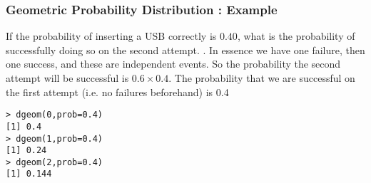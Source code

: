 
\begin{frame}[fragile]
\frametitle{Geometric Probability Distribution : Example}

If the probability of inserting a USB correctly is $0.40$, what is the probability of successfully doing so on the second attempt.
\bigskip.
In essence we have one failure, then one success, and these are independent events. So the probability the second attempt will be successful is $0.6 \times 0.4$. The probability that we are successful on the first attempt (i.e. no failures beforehand) is 0.4

\begin{verbatim}
> dgeom(0,prob=0.4)
[1] 0.4
> dgeom(1,prob=0.4)
[1] 0.24
> dgeom(2,prob=0.4)
[1] 0.144
\end{verbatim}

\end{frame}


